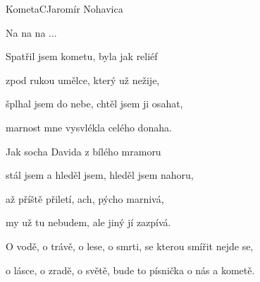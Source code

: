 \begin{song}{Kometa}{C}{Jaromír Nohavica}
\begin{SBVerse}
\end{SBVerse}

\begin{SBChorus}

Na na na ...

\end{SBChorus}

\begin{SBVerse}

Spatřil jsem kometu, byla jak reliéf

zpod rukou umělce, který už nežije,

šplhal jsem do nebe, chtěl jsem ji osahat,

marnost mne vysvlékla celého donaha.

\end{SBVerse}

\begin{SBVerse}

Jak socha Davida z bílého mramoru

stál jsem a hleděl jsem, hleděl jsem nahoru,

až příště přiletí, ach, pýcho marnivá,

my už tu nebudem, ale jiný jí zazpívá.

\end{SBVerse}

\begin{SBChorus}

O vodě, o trávě, o lese, o smrti, se kterou smířit nejde se,

o lásce, o zradě, o světě, bude to písnička o nás a kometě.

\end{SBChorus}

\end{song}
